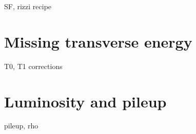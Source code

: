 SF, rizzi recipe

\section{Missing transverse energy}

T0, T1 corrections

\section{Luminosity and pileup}

pileup, rho
